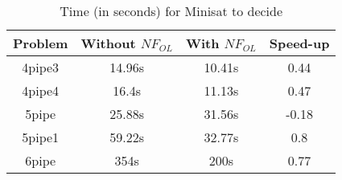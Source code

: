 \documentclass[a4paper, 11pt]{article}
\begin{document}
    \begin{table}[h]
	    \begin{center}
		    \begin{tabular}{|| c || c c c||}
			    \hline
			    Problem&Without $NF_{OL}$&With $NF_{OL}$&Speed-up\\
			    \hline
			    4pipe3 & 14.96s & 10.41s&0.44\\\hline
			    4pipe4 & 16.4s & 11.13s&0.47\\\hline
			    5pipe & 25.88s & 31.56s&-0.18\\\hline
			    5pipe1 & 59.22s & 32.77s&0.8\\\hline
			    6pipe & 354s & 200s&0.77\\
			    \hline
		    \end{tabular}
		    \caption{Time (in seconds) for Minisat to decide}
	    \end{center}
    \end{table}
\end{document}

